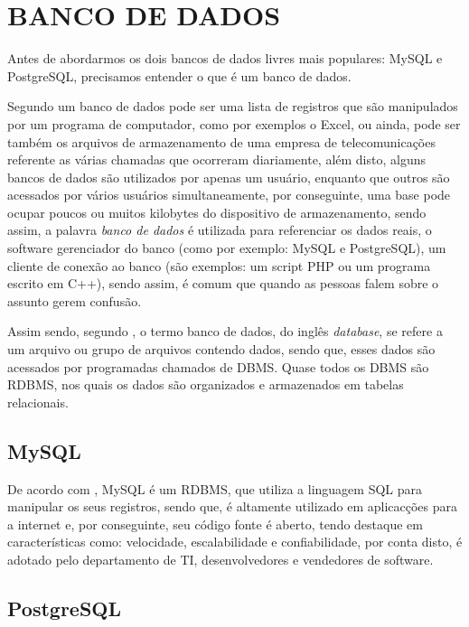 \section{BANCO DE DADOS}

Antes de abordarmos os dois bancos de dados livres mais populares:
\acs{MySQL} e \acs{PostgreSQL}, precisamos entender o que é um banco de
dados.
 
Segundo  um banco de dados pode ser uma
lista de registros que são manipulados por um programa de computador, como por
exemplos o \acs{Excel}, ou ainda, pode ser também os arquivos de armazenamento
de uma empresa de telecomunicações referente as várias chamadas que ocorreram
diariamente, além disto, alguns bancos de dados são utilizados por apenas um
usuário, enquanto que outros são acessados por vários usuários
simultaneamente, por conseguinte, uma base pode ocupar poucos ou muitos
kilobytes do dispositivo de armazenamento, sendo assim, a palavra \textit{banco de dados} 
é utilizada para referenciar os dados reais, o software gerenciador do banco 
(como por exemplo: \acs{MySQL} e \acs{PostgreSQL}), um cliente de conexão 
ao banco (são exemplos:  um script PHP ou um programa escrito em C++), sendo 
assim, é comum que quando as pessoas falem sobre o assunto gerem confusão.

Assim sendo, segundo , o termo banco de dados, do inglês
\textit{database}, se refere a um arquivo ou grupo de arquivos contendo dados, 
sendo que, esses dados são acessados por programadas chamados de \ac{DBMS}.
Quase todos os \acs{DBMS} são \acs{RDBMS}, nos quais os dados são organizados e
armazenados em tabelas relacionais.

\subsection{MySQL}

De acordo com , \acs{MySQL} é um
\ac{RDBMS},  que utiliza a linguagem \ac{SQL} para manipular os seus registros, 
sendo que, é altamente utilizado em aplicacções para a internet e, por
conseguinte,  seu código fonte é aberto, tendo destaque em características
como: velocidade, escalabilidade e confiabilidade, por conta disto, é adotado
pelo departamento de \ac{TI}, desenvolvedores e vendedores de software.

\subsection{PostgreSQL}

